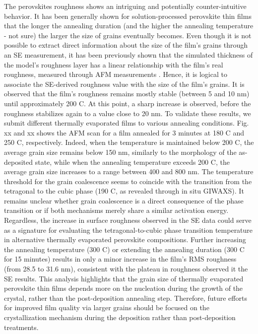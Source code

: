 The perovskites roughness shows an intriguing and potentially counter-intuitive behavior. It has been generally shown for solution-processed perovskite thin films that the longer the annealing duration (and the higher the annealing temperature - not sure) the larger the size of grains eventually becomes. Even though it is not possible to extract direct information about the size of the film's grains through an SE measurement, it has been previously shown that the simulated thickness of the model's roughness layer has a linear relationship with the film's real roughness, measured through AFM measurements \cite{Fujiwara2000AssessmentFilms}. Hence, it is logical to associate the SE-derived roughness value with the size of the film's grains. It is observed that the film's roughness remains mostly stable (between 5 and 10 nm) until approximately 200 \degree C. At this point, a sharp increase is observed, before the roughness stabilizes again to a value close to 20 nm. To validate these results, we submit different thermally evaporated  films to various annealing conditions. Fig. xx and xx shows the AFM scan for a film annealed for 3 minutes at 180 \degree C and 250 \degree C, respectively. Indeed, when the temperature is maintained below 200 \degree C, the average grain size remains below 150 nm, similarly to the morphology of the as-deposited state, while when the annealing temperature exceeds 200 \degree C, the average grain size increases to a range between 400 and 800 nm. The temperature threshold for the grain coalescence seems to coincide with the transition from the tetragonal to the cubic phase (190 \degree C, as revealed through in situ GIWAXS). It remains unclear whether grain coalescence is a direct consequence of the phase transition or if both mechanisms merely share a similar activation energy. Regardless, the increase in surface roughness observed in the SE data could serve as a signature for evaluating the tetragonal-to-cubic phase transition temperature in alternative thermally evaporated perovskite compositions. Further increasing the annealing temperature (300 \degree C) or extending the annealing duration (300 \degree C for 15 minutes) results in only a minor increase in the film's RMS roughness (from 28.5 to 31.6 nm), consistent with the plateau in roughness observed it the SE results. This analysis highlights that the grain size of thermally evaporated perovskite thin films depends more on the nucleation during the growth of the crystal, rather than the post-deposition annealing step. Therefore, future efforts for improved film quality via larger grains should be focused on the crystallization mechanism during the deposition rather than post-deposition treatments. 


